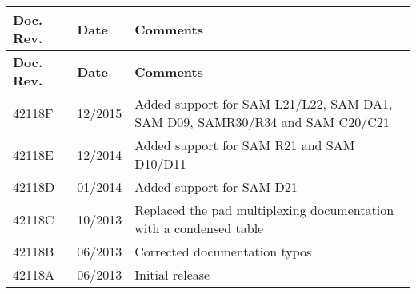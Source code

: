 \tabulinesep=1mm
\begin{longtabu}spread 0pt [c]{*{3}{|X[-1]}|}
\hline
\cellcolor{\tableheadbgcolor}\textbf{ Doc. Rev. }&\cellcolor{\tableheadbgcolor}\textbf{ Date }&\cellcolor{\tableheadbgcolor}\textbf{ Comments  }\\
\endfirsthead
\hline
\endfoot
\hline
\cellcolor{\tableheadbgcolor}\textbf{ Doc. Rev. }&\cellcolor{\tableheadbgcolor}\textbf{ Date }&\cellcolor{\tableheadbgcolor}\textbf{ Comments  }\\
\endhead
42118F &12/2015 &Added support for SAM L21/\+L22, SAM DA1, SAM D09, SAMR30/\+R34 and SAM C20/\+C21  \\
42118E &12/2014 &Added support for SAM R21 and SAM D10/\+D11  \\
42118D &01/2014 &Added support for SAM D21  \\
42118C &10/2013 &Replaced the pad multiplexing documentation with a condensed table  \\
42118B &06/2013 &Corrected documentation typos  \\
42118A &06/2013 &Initial release  \\
\end{longtabu}
